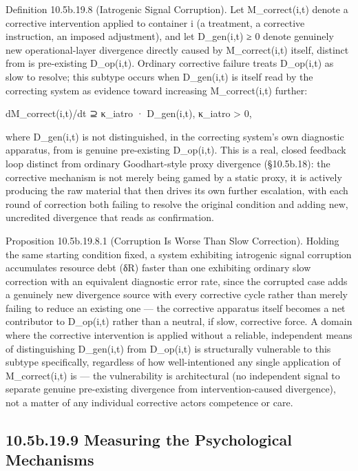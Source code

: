 \documentclass[
]{article}
\begin{document}
Definition 10.5b.19.8 (Iatrogenic Signal Corruption). Let
M\_correct(i,t) denote a corrective intervention applied to container i
(a treatment, a corrective instruction, an imposed adjustment), and let
D\_gen(i,t) ≥ 0 denote genuinely new operational-layer divergence
directly caused by M\_correct(i,t) itself, distinct from is pre-existing
D\_op(i,t). Ordinary corrective failure treats D\_op(i,t) as slow to
resolve; this subtype occurs when D\_gen(i,t) is itself read by the
correcting system as evidence toward increasing M\_correct(i,t) further:

dM\_correct(i,t)/dt ⊇ κ\_iatro · D\_gen(i,t), κ\_iatro \textgreater{} 0,

where D\_gen(i,t) is not distinguished, in the correcting system's own
diagnostic apparatus, from is genuine pre-existing D\_op(i,t). This is a
real, closed feedback loop distinct from ordinary Goodhart-style proxy
divergence (§10.5b.18): the corrective mechanism is not merely being
gamed by a static proxy, it is actively producing the raw material that
then drives its own further escalation, with each round of correction
both failing to resolve the original condition and adding new,
uncredited divergence that reads as confirmation.

Proposition 10.5b.19.8.1 (Corruption Is Worse Than Slow Correction).
Holding the same starting condition fixed, a system exhibiting
iatrogenic signal corruption accumulates resource debt (δR) faster than
one exhibiting ordinary slow correction with an equivalent diagnostic
error rate, since the corrupted case adds a genuinely new divergence
source with every corrective cycle rather than merely failing to reduce
an existing one --- the corrective apparatus itself becomes a net
contributor to D\_op(i,t) rather than a neutral, if slow, corrective
force. A domain where the corrective intervention is applied without a
reliable, independent means of distinguishing D\_gen(i,t) from
D\_op(i,t) is structurally vulnerable to this subtype specifically,
regardless of how well-intentioned any single application of
M\_correct(i,t) is --- the vulnerability is architectural (no
independent signal to separate genuine pre-existing divergence from
intervention-caused divergence), not a matter of any individual
corrective actors competence or care.

\hypertarget{b.19.9-measuring-the-psychological-mechanisms}{%
\subsection{10.5b.19.9 Measuring the Psychological
Mechanisms}\label{b.19.9-measuring-the-psychological-mechanisms}}
\end{document}

